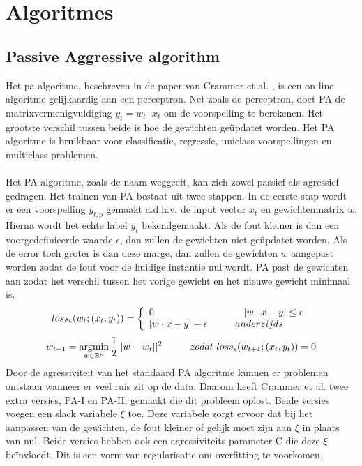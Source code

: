 \section{Algoritmes}
\subsection{Passive Aggressive algorithm}
Het \gls{pa} algoritme, beschreven in de paper van Crammer et al. \cite{pa algorithm}, is een on-line algoritme gelijkaardig aan een perceptron. Net zoals de perceptron, doet PA de matrixvermenigvuldiging $y_t=w_t \cdot x_t$ om de voorspelling te berekenen. Het grootste verschil tussen beide is hoe de gewichten geüpdatet worden. Het PA algoritme is bruikbaar voor classificatie, regressie, uniclass voorspellingen en multiclass problemen.
\\\\
\noindent Het PA algoritme, zoals de naam weggeeft, kan zich zowel passief als agressief gedragen. Het trainen van PA bestaat uit twee stappen. In de eerste stap wordt er een voorspelling $y_{t,p}$ gemaakt a.d.h.v. de input vector $x_t$ en gewichtenmatrix $w$. Hierna wordt het echte label $y_t$ bekendgemaakt. Als de fout kleiner is dan een voorgedefinieerde waarde $\epsilon$, dan zullen de gewichten niet geüpdatet worden. Als de error toch groter is dan deze marge, dan zullen de gewichten $w$ aangepast worden zodat de fout voor de huidige instantie nul wordt. PA past de gewichten aan zodat het verschil tussen het vorige gewicht en het nieuwe gewicht minimaal is. 
\[
    loss_{\epsilon} (w_t;(x_t,y_t))=\left\{
                \begin{array}{ll}
                  0 \tab \tab \tab \ \ |w \cdot x - y| \leq \epsilon \\
                  |w \cdot x - y| - \epsilon \tab anderzijds
                \end{array}
              \right.\\
\]
\[
    w_{t+1}= \operatorname*{argmin}_{w \in \mathbb{R}^n}
     \frac{1}{2}||w-w_t||^2 \hspace*{1cm} zodat \ loss_{\epsilon} (w_{t+1};(x_t,y_t)) = 0
\]
Door de agressiviteit van het standaard PA algoritme kunnen er problemen ontstaan wanneer er veel ruis zit op de data. Daarom heeft Crammer et al. twee extra versies, PA-I en PA-II, gemaakt die dit probleem oplost. Beide versies voegen een slack variabele $\xi$ toe. Deze variabele zorgt ervoor dat bij het aanpassen van de gewichten, de fout kleiner of gelijk moet zijn aan $\xi$ in plaats van nul. Beide versies hebben ook een agressiviteits parameter C die deze $\xi$ beïnvloedt. Dit is een vorm van regularisatie om overfitting te voorkomen.

